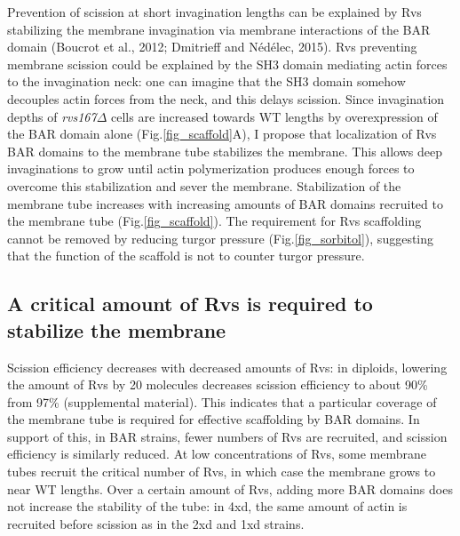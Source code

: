 Prevention of scission at short invagination lengths can be explained by Rvs stabilizing the membrane invagination via membrane interactions of the BAR domain (Boucrot et al., 2012; Dmitrieff and Nédélec, 2015). Rvs preventing membrane scission could be explained by the SH3 domain mediating actin forces to the invagination neck: one can imagine that the SH3 domain somehow decouples actin forces from the neck, and this delays scission. Since invagination depths of \textit{rvs167$\Delta$} cells are increased towards WT lengths by overexpression of the BAR domain alone (Fig.\ref{fig_scaffold}A), I propose that localization of Rvs BAR domains to the membrane tube stabilizes the membrane. This allows deep invaginations to grow until actin polymerization produces enough forces to overcome this stabilization and sever the membrane. Stabilization of the membrane tube increases with increasing amounts of BAR domains recruited to the membrane tube (Fig.\ref{fig_scaffold}). The requirement for Rvs scaffolding cannot be removed by reducing turgor pressure (Fig.\ref{fig_sorbitol}), suggesting that the function of the scaffold is not to counter turgor pressure. 


\subsection{A critical amount of Rvs is required to stabilize the membrane }

\vspace{5mm}
Scission efficiency decreases with decreased amounts of Rvs: in diploids, lowering the amount of Rvs by 20 molecules decreases scission efficiency to about 90\% from 97\% (supplemental material). This indicates that a particular coverage of the membrane tube is required for effective scaffolding by BAR domains. In support of this, in BAR strains, fewer numbers of Rvs are recruited, and scission efficiency is similarly reduced. At low concentrations of Rvs, some membrane tubes recruit the critical number of Rvs, in which case the membrane grows to near WT lengths. Over a certain amount of Rvs, adding more BAR domains does not increase the stability of the tube: in 4xd, the same amount of actin is recruited before scission as in the 2xd and 1xd strains. 

